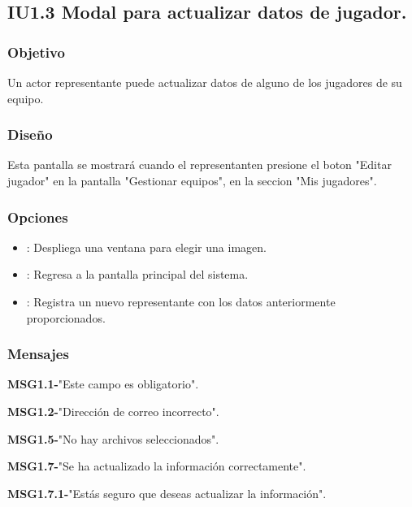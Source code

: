 
\subsection{IU1.3 Modal para actualizar datos de jugador.}

\subsubsection{Objetivo}
	Un actor representante puede actualizar datos de alguno de los jugadores de su equipo.

\subsubsection{Diseño}
  Esta pantalla se mostrará cuando el representanten presione el boton "Editar jugador" en la pantalla "Gestionar equipos", en la seccion "Mis jugadores".

\subsubsection{Opciones}
\begin{itemize}
  \item {}: Despliega una ventana para elegir una imagen.
  \item {}: Regresa a la pantalla principal del sistema.
  \item {}: Registra un nuevo representante con los datos anteriormente proporcionados.
\end{itemize}

\subsubsection{Mensajes}
	\begin{Citemize}
		\item {\bf MSG1.1-}"Este campo es obligatorio".
		\item {\bf MSG1.2-}"Dirección de correo incorrecto".
		\item {\bf MSG1.5-}"No hay archivos seleccionados".
		\item {\bf MSG1.7-}"Se ha actualizado la información correctamente".
		\item {\bf MSG1.7.1-}"Estás seguro que deseas actualizar la información".
	\end{Citemize}